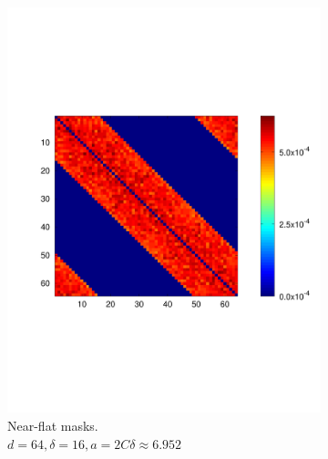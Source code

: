 \begin{figure}
\begin{subfigure}[b]{.49\textwidth}
    \includegraphics[width=\textwidth,trim={.4in 2.5in .8in 2.5in}]{figs/flatvar512}
    \caption{Near-flat masks.\\  $d = 64, \delta = 16, a = 2 C \delta \approx 6.952$}
    \label{fig:flatvar64}
  \end{subfigure}
  \begin{subfigure}[b]{.49\textwidth}
    \centering

\end{subfigure}
\end{figure}
